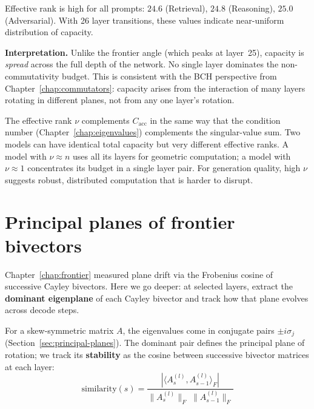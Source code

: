 \documentclass[11pt, twoside, openright]{memoir}
\numberwithin{equation}{chapter}
\begin{document}
\begin{finding}
Effective rank is high for all prompts: $24.6$ (Retrieval), $24.8$
(Reasoning), $25.0$ (Adversarial).  With 26 layer transitions,
these values indicate near-uniform distribution of capacity.

\textbf{Interpretation.}
Unlike the frontier angle (which peaks at layer~25), capacity is
\emph{spread} across the full depth of the network.  No single
layer dominates the non-commutativity budget.  This is consistent
with the BCH perspective from Chapter~\ref{chap:commutators}:
capacity arises from the interaction of many layers rotating in
different planes, not from any one layer's rotation.
\end{finding}

\begin{keyidea}
The effective rank $\nu$ complements $C_{\mathrm{acc}}$ in the
same way that the condition number
(Chapter~\ref{chap:eigenvalues}) complements the singular-value
sum.  Two models can have identical total capacity but very
different effective ranks.  A model with $\nu \approx n$ uses
all its layers for geometric computation; a model with
$\nu \approx 1$ concentrates its budget in a single layer pair.
For generation quality, high $\nu$ suggests robust,
distributed computation that is harder to disrupt.
\end{keyidea}


\section{Principal planes of frontier bivectors}
\label{sec:cap-planes}

Chapter~\ref{chap:frontier} measured plane drift via the Frobenius
cosine of successive Cayley bivectors.  Here we go deeper: at
selected layers, extract the \textbf{dominant eigenplane} of each
Cayley bivector and track how that plane evolves across decode
steps.

For a skew-symmetric matrix $A$, the eigenvalues come in
conjugate pairs $\pm i\sigma_j$
(Section~\ref{sec:principal-planes}).  The dominant pair defines
the principal plane of rotation; we track its \textbf{stability} as the
cosine between successive bivector matrices at each layer:
\begin{equation}
  \text{similarity}(s)
  = \frac{|\langle A^{(l)}_s, A^{(l)}_{s-1}\rangle_F|}
         {\|A^{(l)}_s\|_F\;\|A^{(l)}_{s-1}\|_F}
\end{equation}
\end{document}
